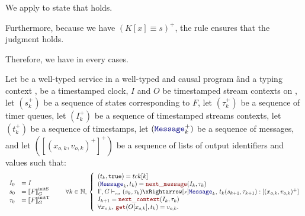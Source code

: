 \begin{skippableproof}
\begin{itemize}
\begin{itemize}
                        We apply  to state that
                         holds.

                        Furthermore, because we have $(K[x] \equiv s)^+$, the rule
                         ensures that the judgment
                         holds.
              \end{itemize}
              Therefore, we have  in every cases.
    \end{itemize}

    Let  be a well-typed service in a well-typed and causal program \G and a
    typing context \tyCtx, \tck be a timestamped clock, $I$ and $O$ be timestamped stream
    contexts on \tck, let $(s_k^+)$ be a sequence of states corresponding to $F$, let $(\tau_k^+)$
    be a sequence of timer queues, let $(I_k^+)$ be a sequence of timestamped streams contexts, let
    $(t_k^+)$ be a sequence of timestamps, let $(\mess_k^+)$ be a sequence of messages, and let
    $([(x_{o, k}, v_{o, k})^+]^+)$ be a sequence of lists of output identifiers and values such that:
    \begin{equation*}
        \begin{array}{ll}
            I_0    & = I             \\
            s_0    & = \initstate{F} \\
            \tau_0 & = \inittimer{F} \\
        \end{array} \qquad
        \forall k \in \N, \,
        \left\{
        \begin{array}{ll}
            (t_k, \true) = \tck[k]                                                                   \\
            (\mess_k, t_k) = \nextMess{I_k}{\tau_k}                                                  \\
            \serviceOpSem{s_k}{\tau_k}{F}{\mess_k}{t_k}{s_{k+1}}{\tau_{k+1}}{(x_{o, k}, v_{o, k})^+} \\
            I_{k+1} = \nextContext{I_k}{\tau_k}                                                      \\
            \forall x_{o, k}, \, \getAt{O[x_{o, k}]}{t_k} = v_{o, k}.
        \end{array}
        \right.
    \end{equation*}


\end{skippableproof}
